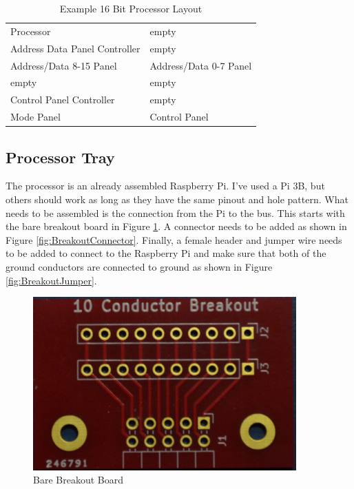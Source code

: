 \documentclass[10pt, openany]{book}
\begin{document}
\begin{table}[ht!]
  \caption{Example 16 Bit Processor Layout}
  \label{tbl:Basic}
  \centering
  \begin{tabular}{|l|l|}
    \hline
    Processor & empty\\
    Address Data Panel Controller & empty\\
    Address/Data 8-15 Panel & Address/Data 0-7 Panel\\
    \hline
    empty & empty\\
    Control Panel Controller & empty\\
    Mode Panel & Control Panel\\
    \hline
  \end{tabular}
\end{table}

\subsection{Processor Tray}
The processor is an already assembled Raspberry Pi.  I've used a Pi 3B, but others should work as long as they have the same pinout and hole pattern.  What needs to be assembled is the connection from the Pi to the bus.  This starts with the bare breakout board in Figure \ref{fig:BreakoutBare}.  A connector needs to be added as shown in Figure \ref{fig:BreakoutConnector}.  Finally, a female header and jumper wire needs to be added to connect to the Raspberry Pi and make sure that both of the ground conductors are connected to ground as shown in Figure \ref{fig:BreakoutJumper}.

\begin{figure}[ht!]
  \centering
  \includegraphics[width=0.9\textwidth]{../Pict/Breakout-Bare.jpg}
  \caption{Bare Breakout Board}
  \label{fig:BreakoutBare}
\end{figure}
\end{document}
